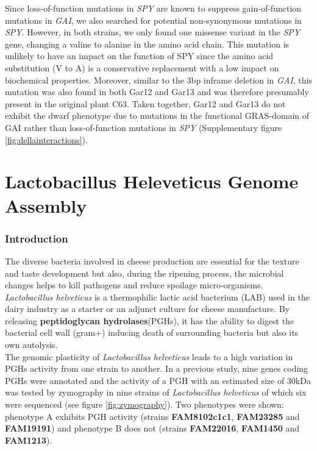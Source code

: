 \documentclass[10pt,a4paper]{article}
\begin{document}
Since loss-of-function mutations in \textit{SPY} are known to suppress gain-of-function mutations in \textit{GAI}, we also searched for potential non-synonymous mutations in \textit{SPY}. However, in both strains, we only found one missense variant in the \textit{SPY} gene, changing a valine to alanine in the amino acid chain. This mutation is unlikely to have an impact on the function of SPY since the amino acid substitution (V to A) is a conservative replacement with a low impact on biochemical properties. Moreover, similar to the 3bp inframe deletion in \textit{GAI}, this mutation was also found in both Gar12 and Gar13 and was therefore presumably present in the original plant C63. Taken together, Gar12 and Gar13 do not exhibit the dwarf phenotype due to mutations in the functional GRAS-domain of GAI rather than loss-of-function mutations in \textit{SPY}  (Supplementary figure \ref{fig:dellainteractions}).





\newpage
\part*{Lactobacillus Heleveticus Genome Assembly}
\section*{Introduction}

The diverse bacteria involved in cheese production are essential for the texture and taste development but also, during the ripening process, the microbial changes helps to kill pathogens and reduce spoilage micro-organisms. \textit{Lactobacillus helveticus} is a thermophilic lactic acid bacterium (LAB) used in the dairy industry as a starter or an adjunct culture for cheese manufacture. By releasing \textbf{peptidoglycan hydrolases}(PGHs), it has the ability to digest the bacterial cell wall (gram+) inducing death of surrounding bacteria but also its own autolysis. \\

\noindent The genomic plasticity of \textit{Lactobacillus helveticus} leads to a high variation in PGHs activity from one strain to another. 
In a previous study\cite{jebava_nine_2011}, nine genes coding PGHs were annotated and the activity of a PGH with an estimated size of 30kDa was tested by zymography in nine strains of \textit{Lactobacillus helveticus} of which six were sequenced (see figure \ref{fig:zymography}). Two phenotypes were shown: phenotype A exhibits PGH activity (strains \textbf{FAM8102c1c1}, \textbf{FAM23285} and \textbf{FAM19191}) and phenotype B does not (strains \textbf{FAM22016}, \textbf{FAM1450} and \textbf{FAM1213}).\\
\end{document}
